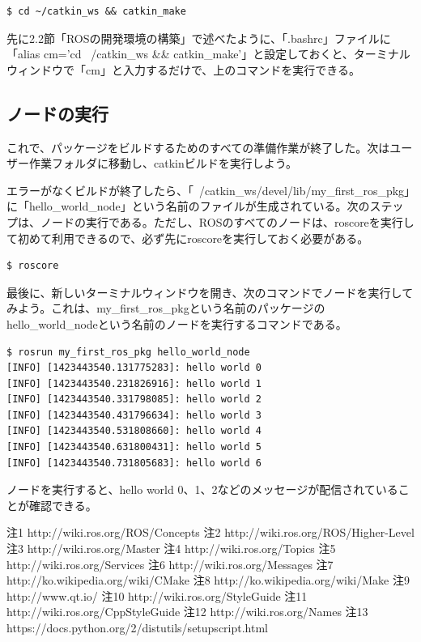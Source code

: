 \begin{lstlisting}[language=ROS]
$ cd ~/catkin_ws && catkin_make
\end{lstlisting}

\begin{exercise}[短縮コマンド]
先に2.2節「ROSの開発環境の構築」で述べたように、「.bashrc」ファイルに「alias cm='cd ~/catkin\_ws \&\& catkin\_make'」と設定しておくと、ターミナルウィンドウで「cm」と入力するだけで、上のコマンドを実行できる。
\end{exercise}

\subsection{ノードの実行}
これで、パッケージをビルドするためのすべての準備作業が終了した。次はユーザー作業フォルダに移動し、catkinビルドを実行しよう。

エラーがなくビルドが終了したら、「~/catkin\_ws/devel/lib/my\_first\_ros\_pkg」に「hello\_world\_node」という名前のファイルが生成されている。次のステップは、ノードの実行である。ただし、ROSのすべてのノードは、roscoreを実行して初めて利用できるので、必ず先にroscoreを実行しておく必要がある。

\begin{lstlisting}[language=ROS]
$ roscore
\end{lstlisting}

最後に、新しいターミナルウィンドウを開き、次のコマンドでノードを実行してみよう。これは、my\_first\_ros\_pkgという名前のパッケージのhello\_world\_nodeという名前のノードを実行するコマンドである。

\begin{lstlisting}[language=ROS]
$ rosrun my_first_ros_pkg hello_world_node
[INFO] [1423443540.131775283]: hello world 0
[INFO] [1423443540.231826916]: hello world 1
[INFO] [1423443540.331798085]: hello world 2
[INFO] [1423443540.431796634]: hello world 3
[INFO] [1423443540.531808660]: hello world 4
[INFO] [1423443540.631800431]: hello world 5
[INFO] [1423443540.731805683]: hello world 6
\end{lstlisting}

ノードを実行すると、hello world 0、1、2などのメッセージが配信されていることが確認できる。


注1  http://wiki.ros.org/ROS/Concepts
注2  http://wiki.ros.org/ROS/Higher-Level%
注3  http://wiki.ros.org/Master
注4  http://wiki.ros.org/Topics
注5  http://wiki.ros.org/Services
注6  http://wiki.ros.org/Messages
注7  http://ko.wikipedia.org/wiki/CMake
注8  http://ko.wikipedia.org/wiki/Make
注9  http://www.qt.io/
注10 http://wiki.ros.org/StyleGuide
注11 http://wiki.ros.org/CppStyleGuide
注12 http://wiki.ros.org/Names
注13 https://docs.python.org/2/distutils/setupscript.html


